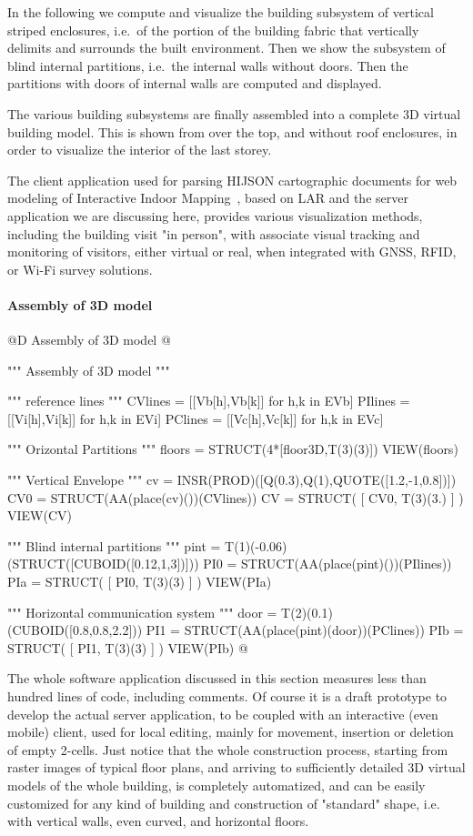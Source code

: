 \documentclass[11pt,oneside]{article}    %
\begin{document}
In the following we compute and visualize the building subsystem of vertical striped enclosures, i.e.~of the portion of the building fabric that vertically delimits and surrounds the built environment. Then we show the subsystem of blind internal partitions, i.e.~the internal walls without doors. Then the partitions with doors of internal walls are computed and displayed.

The various building subsystems are finally assembled into a complete 3D virtual building model.
This is shown from over the top, and without roof enclosures, in order to visualize the interior of the last storey.

The client application used for parsing HIJSON cartographic documents for web modeling of Interactive Indoor Mapping~\cite{SpiniVSPMB-STAG2015,paoluzziMS:2014}, based on LAR and the server application we are discussing here, provides various visualization methods, including the building visit "in person", with associate visual tracking and monitoring of visitors, either virtual or real, when integrated with GNSS, RFID, or Wi-Fi survey solutions.

\paragraph{Assembly of 3D model}
@D Assembly of 3D model
@{""" Assembly of 3D model """

""" reference lines """
CVlines = [[Vb[h],Vb[k]] for h,k in EVb]
PIlines = [[Vi[h],Vi[k]] for h,k in EVi]
PClines = [[Vc[h],Vc[k]] for h,k in EVc]

""" Orizontal Partitions """
floors = STRUCT(4*[floor3D,T(3)(3)])
VIEW(floors)

""" Vertical Envelope """
cv = INSR(PROD)([Q(0.3),Q(1),QUOTE([1.2,-1,0.8])])
CV0 = STRUCT(AA(place(cv)())(CVlines))
CV = STRUCT( [ CV0, T(3)(3.) ] )
VIEW(CV)

""" Blind internal partitions """
pint = T(1)(-0.06)(STRUCT([CUBOID([0.12,1,3])]))
PI0 = STRUCT(AA(place(pint)())(PIlines))
PIa = STRUCT( [ PI0, T(3)(3) ] )
VIEW(PIa)

""" Horizontal communication system """
door = T(2)(0.1)(CUBOID([0.8,0.8,2.2]))
PI1 = STRUCT(AA(place(pint)(door))(PClines))
PIb = STRUCT( [ PI1, T(3)(3) ] )
VIEW(PIb)
@}

The whole software application discussed in this section measures less than hundred lines of code, including comments. Of course it is a draft prototype to develop the actual server application, to be coupled with an interactive (even mobile) client, used for local editing, mainly for movement, insertion or deletion of empty 2-cells. Just notice that the whole construction process, starting from raster images of typical floor plans, and arriving to sufficiently detailed 3D virtual models of the whole building, is completely automatized, and can be easily customized for any kind of building and construction of "standard" shape, i.e. with vertical walls, even curved, and horizontal floors.
\end{document}
